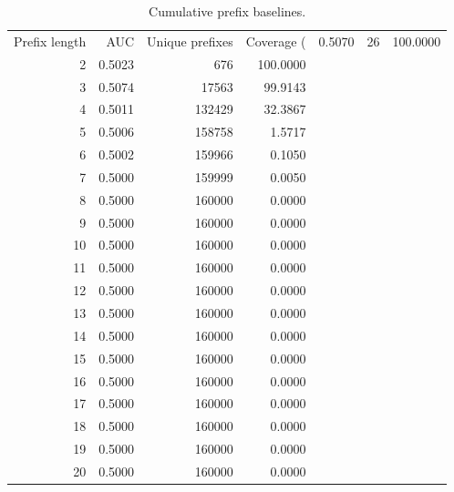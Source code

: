 \begin{table}
\caption{Cumulative prefix baselines.}
\label{tab:prefix_baselines}
\begin{tabular}{rrrr}
\toprule
Prefix length & AUC & Unique prefixes & Coverage (%
 & 0.5070 & 26 & 100.0000 \\
2 & 0.5023 & 676 & 100.0000 \\
3 & 0.5074 & 17563 & 99.9143 \\
4 & 0.5011 & 132429 & 32.3867 \\
5 & 0.5006 & 158758 & 1.5717 \\
6 & 0.5002 & 159966 & 0.1050 \\
7 & 0.5000 & 159999 & 0.0050 \\
8 & 0.5000 & 160000 & 0.0000 \\
9 & 0.5000 & 160000 & 0.0000 \\
10 & 0.5000 & 160000 & 0.0000 \\
11 & 0.5000 & 160000 & 0.0000 \\
12 & 0.5000 & 160000 & 0.0000 \\
13 & 0.5000 & 160000 & 0.0000 \\
14 & 0.5000 & 160000 & 0.0000 \\
15 & 0.5000 & 160000 & 0.0000 \\
16 & 0.5000 & 160000 & 0.0000 \\
17 & 0.5000 & 160000 & 0.0000 \\
18 & 0.5000 & 160000 & 0.0000 \\
19 & 0.5000 & 160000 & 0.0000 \\
20 & 0.5000 & 160000 & 0.0000 \\
\bottomrule
\end{tabular}
\end{table}
